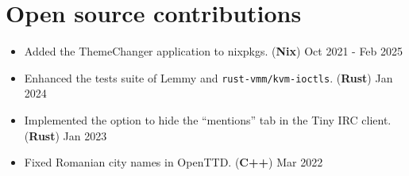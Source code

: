 \documentclass[a4paper,11pt]{article}
\begin{document}

\section{Open source contributions}
\begin{itemize}[nosep,after=\strut, leftmargin=1em, itemsep=3pt]
    \item Added the ThemeChanger application to nixpkgs. (\textbf{Nix}) \hfill \faCalendar*[regular] Oct 2021 - Feb 2025
    \item Enhanced the tests suite of Lemmy and \verb|rust-vmm/kvm-ioctls|. (\textbf{Rust}) \hfill \faCalendar*[regular] Jan 2024
    \item Implemented the option to hide the ``mentions'' tab in the Tiny IRC client. (\textbf{Rust}) \hfill \faCalendar*[regular] Jan 2023
    \item Fixed Romanian city names in OpenTTD. (\textbf{C++}) \hfill \faCalendar*[regular] Mar 2022
    \\[-20pt]
\end{itemize}


\end{document}
